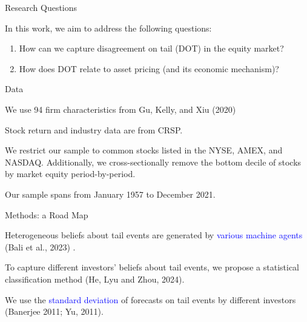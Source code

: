\documentclass[11pt, aspectratio=169]{beamer}
\newenvironment{wideitemize}{\itemize\addtolength{\itemsep}{10pt}}{\enditemize}
\begin{document}
\begin{frame}{Research Questions}
    \bigskip
    \begin{wideitemize}
    \item In this work, we aim to address the following questions:
    \bigskip
    \begin{enumerate}
        \item How can we \alert{capture} disagreement on tail (DOT) in the equity market?
        \bigskip
        \item How does DOT relate to \alert{asset pricing} (and its economic mechanism)?
        \bigskip
        \bigskip
    \end{enumerate}
    \end{wideitemize}
\end{frame}

\begin{frame}{Data}
    \bigskip
    \begin{wideitemize}
    \item We use 94 firm characteristics from Gu, Kelly, and Xiu (2020) %
    \item Stock return and industry data are from CRSP.
    \item We restrict our sample to common stocks listed in the NYSE, AMEX, and NASDAQ. Additionally, we cross-sectionally remove the bottom decile of stocks by market equity period-by-period.
    \item Our sample spans from January 1957 to December 2021.
    \end{wideitemize}
\end{frame}


\begin{frame}{Methods: a Road Map}
    \bigskip
    \begin{wideitemize}
    \item Heterogeneous beliefs about tail events are generated by \textcolor{blue}{various machine agents} (Bali et al., 2023) .
    
    \item To capture different investors' beliefs about tail events, we propose a statistical \alert{classification} method (He, Lyu and Zhou, 2024).

    \item We use the \textcolor{blue}{standard deviation} of forecasts on tail events by different investors (Banerjee 2011; Yu, 2011).
    \end{wideitemize}
\end{frame}
\end{document}
